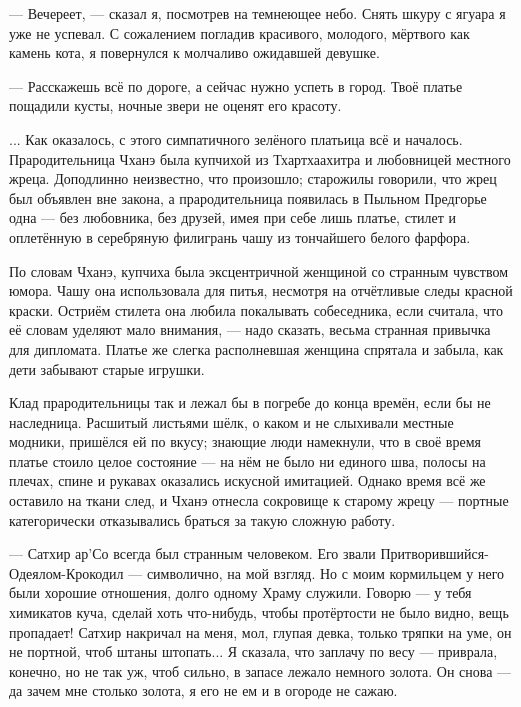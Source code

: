--- Вечереет, --- сказал я, посмотрев на темнеющее небо.
Снять шкуру с ягуара я уже не успевал.
С сожалением погладив красивого, молодого, мёртвого как камень кота, я повернулся к молчаливо ожидавшей девушке.

--- Расскажешь всё по дороге, а сейчас нужно успеть в город.
Твоё платье пощадили кусты, ночные звери не оценят его красоту.

... Как оказалось, с этого симпатичного зелёного платьица всё и началось.
Прародительница Чханэ была купчихой из Тхартхаахитра и любовницей местного жреца.
Доподлинно неизвестно, что произошло;
старожилы говорили, что жрец был объявлен вне закона, а прародительница появилась в Пыльном Предгорье одна --- без любовника, без друзей, имея при себе лишь платье, стилет и оплетённую в серебряную филигрань чашу из тончайшего белого фарфора.

По словам Чханэ, купчиха была эксцентричной женщиной со странным чувством юмора.
Чашу она использовала для питья, несмотря на отчётливые следы красной краски\FM.
Остриём стилета она любила покалывать собеседника, если считала, что её словам уделяют мало внимания, --- надо сказать, весьма странная привычка для дипломата.
Платье же слегка располневшая женщина спрятала и забыла, как дети забывают старые игрушки.

Клад прародительницы так и лежал бы в погребе до конца времён, если бы не наследница.
Расшитый листьями шёлк, о каком и не слыхивали местные модники, пришёлся ей по вкусу;
знающие люди намекнули, что в своё время платье стоило целое состояние --- на нём не было ни единого шва, полосы на плечах, спине и рукавах оказались искусной имитацией.
Однако время всё же оставило на ткани след, и Чханэ отнесла сокровище к старому жрецу --- портные категорически отказывались браться за такую сложную работу.

--- Сатхир ар’Со всегда был странным человеком.
Его звали Притворившийся-Одеялом-Крокодил --- символично, на мой взгляд.
Но с моим кормильцем у него были хорошие отношения, долго одному Храму служили.
Говорю --- у тебя химикатов куча, сделай хоть что-нибудь, чтобы протёртости не было видно, вещь пропадает!
Сатхир накричал на меня, мол, глупая девка, только тряпки на уме, он не портной, чтоб штаны штопать...
Я сказала, что заплачу по весу --- приврала, конечно, но не так уж, чтоб сильно, в запасе лежало немного золота.
Он снова --- да зачем мне столько золота, я его не ем и в огороде не сажаю.

